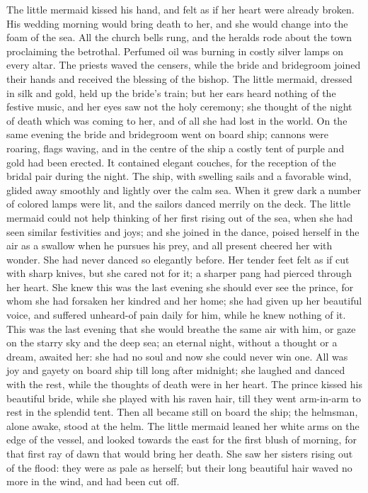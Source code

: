 The little mermaid kissed his hand, and felt as if her heart
were already broken. 
His wedding morning would bring death to her, and
she would change into the foam of the sea. 
All the church bells
rung, and the heralds rode about the town proclaiming the betrothal.
Perfumed oil was burning in costly silver lamps on every altar. 
The
priests waved the censers, while the bride and bridegroom joined their
hands and received the blessing of the bishop. 
The little mermaid,
dressed in silk and gold, held up the bride's train; but her ears
heard nothing of the festive music, and her eyes saw not the holy
ceremony; she thought of the night of death which was coming to her,
and of all she had lost in the world. 
On the same evening the bride
and bridegroom went on board ship; cannons were roaring, flags waving,
and in the centre of the ship a costly tent of purple and gold had
been erected. 
It contained elegant couches, for the reception of the
bridal pair during the night. 
The ship, with swelling sails and a
favorable wind, glided away smoothly and lightly over the calm sea.
When it grew dark a number of colored lamps were lit, and the
sailors danced merrily on the deck. 
The little mermaid could not
help thinking of her first rising out of the sea, when she had seen
similar festivities and joys; and she joined in the dance, poised
herself in the air as a swallow when he pursues his prey, and all
present cheered her with wonder. 
She had never danced so elegantly
before. 
Her tender feet felt as if cut with sharp knives, but she
cared not for it; a sharper pang had pierced through her heart. 
She
knew this was the last evening she should ever see the prince, for
whom she had forsaken her kindred and her home; she had given up her
beautiful voice, and suffered unheard-of pain daily for him, while
he knew nothing of it. 
This was the last evening that she would
breathe the same air with him, or gaze on the starry sky and the
deep sea; an eternal night, without a thought or a dream, awaited her:
she had no soul and now she could never win one. 
All was joy and
gayety on board ship till long after midnight; she laughed and
danced with the rest, while the thoughts of death were in her heart.
The prince kissed his beautiful bride, while she played with his raven
hair, till they went arm-in-arm to rest in the splendid tent. 
Then all
became still on board the ship; the helmsman, alone awake, stood at
the helm. 
The little mermaid leaned her white arms on the edge of
the vessel, and looked towards the east for the first blush of
morning, for that first ray of dawn that would bring her death. 
She
saw her sisters rising out of the flood: they were as pale as herself;
but their long beautiful hair waved no more in the wind, and had
been cut off.

